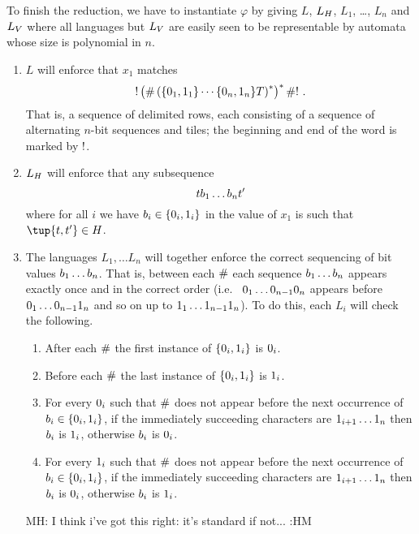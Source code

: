 \documentclass{article}
\newcommand{\mat}[1]{\color{cyan} {MH: #1 :HM} \color{black}}
\begin{document}
To finish the reduction, we have to instantiate $\varphi$ by giving
$L$, $L_\hcons$, $L_1$, \ldots, $L_n$ and $L_\vcons$ where all languages but $L_\vcons$ are easily seen to be representable by automata whose size is polynomial in $n$.
\begin{enumerate}
\item
    $L$ will enforce that $x_1$ matches
    \[
        \resetchar
        \brac{
            \rowdelim
            \brac{
                \set{\nbit{1}{0},\nbit{1}{1}}
                \cdots
                \set{\nbit{n}{0},\nbit{n}{1}}
                \tiles
            }^\ast
        }^\ast
        \rowdelim
        \resetchar \ .
    \]
    That is, a sequence of delimited rows, each consisting of a sequence of alternating $n$-bit sequences and tiles;
    the beginning and end of the word is marked by $\resetchar$.

\item
    $L_\hcons$ will enforce that any subsequence
    \[
        \tile \bit_1 \ldots \bit_n \tile'
    \]
    where for all $i$ we have
    $\bit_i \in \set{\nbit{i}{0}, \nbit{i}{1}}$
    in the value of $x_1$ is such that $\tup{\tile, \tile'} \in \hcons$.

\item
    The languages $L_1, \ldots L_n$ will together enforce the correct sequencing of bit values $\bit_1 \ldots \bit_n$.
    That is, between each $\rowdelim$ each sequence $\bit_1 \ldots \bit_n$ appears exactly once and in the correct order
    (i.e.\ %
    $\nbit{1}{0}\ldots\nbit{n-1}{0}\nbit{n}{0}$
    appears before
    $\nbit{1}{0}\ldots\nbit{n-1}{0}\nbit{n}{1}$
    and so on up to
    $\nbit{1}{1}\ldots\nbit{n-1}{1}\nbit{n}{1}$).
    To do this, each $L_i$ will check the following.
    \begin{enumerate}
    \item
        After each $\rowdelim$ the first instance of
        $\set{\nbit{i}{0},\nbit{i}{1}}$
        is $\nbit{i}{0}$.
    \item
        Before each $\rowdelim$ the last instance of
        $\set{\nbit{i}{0},\nbit{i}{1}}$
        is $\nbit{i}{1}$.
    \item
        For every $\nbit{i}{0}$ such that
        $\rowdelim$ does not appear before the next occurrence of
        $\bit_i \in \set{\nbit{i}{0},\nbit{i}{1}}$,
        if the immediately succeeding characters are
        $\nbit{i+1}{1}\ldots\nbit{n}{1}$
        then $\bit_i$ is $\nbit{i}{1}$,
        otherwise $\bit_i$ is $\nbit{i}{0}$.
    \item
        For every $\nbit{i}{1}$ such that
        $\rowdelim$ does not appear before the next occurrence of
        $\bit_i \in \set{\nbit{i}{0},\nbit{i}{1}}$,
        if the immediately succeeding characters are
        $\nbit{i+1}{1}\ldots\nbit{n}{1}$
        then $\bit_i$ is $\nbit{i}{0}$,
        otherwise $\bit_i$ is $\nbit{i}{1}$.
    \end{enumerate}
    \mat{I think i've got this right: it's standard if not...}
\end{enumerate}
\end{document}
